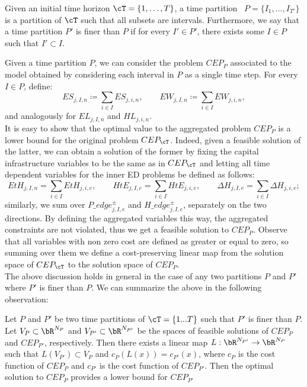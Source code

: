 \begin{definition}
Given an initial time horizon \(\cT = \{1, \ldots, T\}\), a time partition  \(P=\{I_1,...,I_{T'}\}\) is a partition of \(\cT\) such that all subsets are intervals. Furthermore, we say that a time partition \(P'\) is finer than \(P\) if for every \(I' \in P'\), there exists some \(I \in P\) such that \(I' \subset I\).
\end{definition}

Given a time partition $P$, we can consider the problem \(CEP_P\) associated to the model obtained by considering each interval in \(P\) as a single time step. For every \(I\in P\), define:
\[
ES_{j,I,n} \coloneqq \sum_{i \in I} ES_{j,i,n}, \quad\quad EW_{j,I,n} \coloneqq \sum_{i \in I} EW_{j,i,n}, 
\]
and analogously for $EL_{j,I,n}$ and $HL_{j,i,n}$. \\

It is easy to show that the optimal value to the aggregated problem \(CEP_P\) is a lower bound for the original problem \(CEP_{\cT}\). Indeed, given a feasible solution of the latter, we can obtain a solution of the former by fixing the capital infrastructure variables to be the same as in \(CEP_{\cT}\) and letting all time dependent variables for the inner ED problems be defined as follows:
\[
EtH_{j,I,n} = \sum_{i \in I} EtH_{j,i,e}, \quad\quad HtE_{j,I,e} = \sum_{i \in I} HtE_{j,i,e},  \quad\quad \Delta H_{j,I,e} = \sum_{i \in I} \Delta H_{j,i,e};
\]
similarly, we sum over \(P\_edge^\pm_{j,I,e}\) and \(H\_edge^\pm_{j,I,e}\), separately on the two directions.
By defining the aggregated variables this way, the aggregated constraints are not violated, thus we get a feasible solution to \(CEP_P\).
Observe that all variables with non zero cost are defined as greater or equal to zero, so summing over them we define a cost-preserving linear map from the solution space of \(CEP_{\cT}\) to the solution space of \(CEP_P\).\\

The above discussion holds in general in the case of any two partitions $P$ and $P'$ where $P'$ is finer than $P$.
We can summarize the above in the following observation:
\color{pink}
\begin{observation}
Let $P$ and $P'$ be two time partitions of $\cT=\{1...T\}$ such that $P'$ is finer than $P$. Let \(V_{P} \subset \bR^{N_{P}}\) and \(V_{P'} \subset \bR^{N_{P'}}\) be the spaces of feasible solutions of \(CEP_{P}\) and \(CEP_{P'}\), respectively. Then there exists a linear map \(L: \bR^{N_{P'}} \to \bR^{N_{P}}\) such that \(L(V_{P'}) \subset V_{P}\) and \(c_{P}(L(x)) = c_{P'}(x)\), where \(c_{P}\) is the cost function of \(CEP_{P}\) and \(c_{P'}\) is the cost function of \(CEP_{P'}\).
Then the optimal solution to $CEP_{P}$ provides a lower bound for $CEP_{P'}$
\end{observation}
\color{black}


